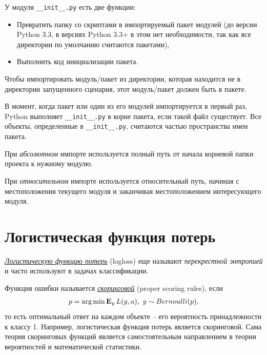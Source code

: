 \documentclass[%
	11pt,
	a4paper,
	utf8,
		]{article}
\begin{document}

У модуля \verb|__init__.py| есть две функции:
\begin{itemize}
	\item Превратить папку со скриптами в импортируемый пакет модулей (до версии Python 3.3, в версиях Python 3.3+ в этом нет необходимости, так как все директории по умолчанию считаются пакетами),
	
	\item Выполнить код инициализации пакета.
\end{itemize}

Чтобы импортировать модуль/пакет из директории, которая находится не в директории запущенного сценария, этот модуль/пакет должен быть в пакете.

В момент, когда пакет или один из его модулей импортируется в первый раз, Python выполняет \verb|__init__.py| в корне пакета, если такой файл существует. Все объекты, определенные в \verb|__init__.py|, считаются частью пространства имен пакета.


При \emph{абсолютном} импорте используется полный путь от начала корневой папки проекта к нужному модулю.

При \emph{относительном} импорте используется относительный путь, начиная с местоположения текущего модуля и заканчивая местоположением интересующего модуля.


\section{Логистическая функция потерь}

\href{https://dyakonov.org/2018/03/12/логистическая-функция-ошибки/}{\emph{Логистическую функцию потерь}} (logloss) еще называют \emph{перекрестной энтропией} и часто используют в задачах классификации.

Функция ошибки называется \href{https://dyakonov.org/2020/12/28/proper-scoring-rules/}{\emph{скоринговой}} (proper scoring rules), если
\begin{align*}
	p = \operatorname*{arg\,min} \mathbf{E}_y \,L(y, a), \ y \sim Bernoulli(p),
\end{align*}
то есть оптимальный ответ на каждом объекте -- его вероятность принадлежности к классу 1. Например, логистическая функция потерь является скоринговой. Сама теория скоринговых функций является самостоятельным направлением в теории вероятностей и математической статистики.
\end{document}
